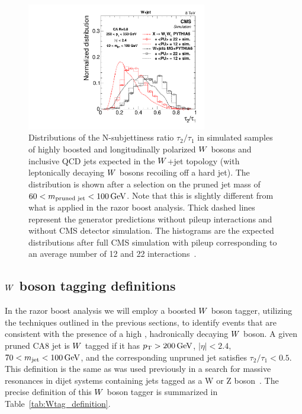 \begin{figure}[htpb]
  \centering
  \includegraphics[width=0.7\textwidth]{figures/razor_wtag/tau2tau1_afterMass}
  \caption{Distributions of the N-subjettiness ratio $\tau_2 / \tau_1$ in simulated samples of
highly boosted and longitudinally polarized $W$ bosons and inclusive QCD jets expected in the
$W$+jet topology (\ie with leptonically decaying $W$ bosons recoiling off a hard jet). 
The distribution is shown after a selection on the pruned jet mass of $60 < m_{\textrm{pruned jet}}
< 100 \,\text{Ge\hspace{-.08em}V}$. Note that this is slightly different from what is applied in the razor boost analysis.
Thick dashed lines represent the generator predictions without pileup interactions and without CMS
detector simulation. The histograms are the expected distributions after full CMS simulation with
pileup corresponding to an average number of 12 and 22 interactions~\cite{Khachatryan:2014vla}. 
  \label{fig:boost_wtag_tau2tau1}}
\end{figure}



\subsection{\texorpdfstring{$W$}{W} boson tagging definitions}

In the razor boost analysis we will employ a boosted $W$ boson tagger, utilizing the techniques
outlined in the previous sections, to identify events that are consistent with the presence of a
high \pt, hadronically decaying $W$ boson. 
A given pruned CA8 jet is $W$ tagged if it has $p_{\mathrm{T}} > 200\,\text{Ge\hspace{-.08em}V}$, $|\eta|<2.4$, $70 < m_\textrm{jet}
< 100\,\text{Ge\hspace{-.08em}V}$, and the corresponding unpruned jet satisfies $\tau_2 / \tau_1 < 0.5$.
This definition is the same as was used previously in a search for massive resonances in dijet
systems containing jets tagged as a W or Z boson~\cite{EXO-12-024,EXO-13-009}. 
The precise definition of this $W$ boson tagger is summarized in Table~\ref{tab:Wtag_definition}.

